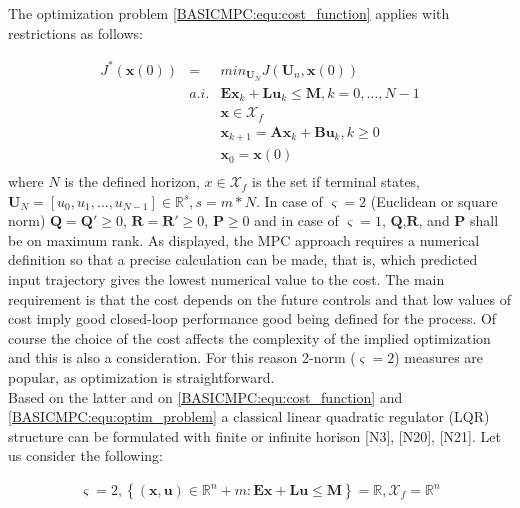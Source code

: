 		The optimization problem \ref{BASICMPC:equ:cost_function} applies with restrictions as follows:
		
		\begin{equation}
        \begin{array}{rcl}
				J^*(\textbf{x}(0))&=&min_{\textbf{U}_N}J(\textbf{U}_n,\textbf{x}(0))\\
					&a.i.&\textbf{Ex}_k+\textbf{Lu}_k\leq \textbf{M},k=0,\dots,N-1\\
					&&\textbf{x}\in \mathcal{X}_f\\
					&&\textbf{x}_{k+1}=\textbf{Ax}_k+\textbf{Bu}_k,k\geq0\\
					&&\textbf{x}_0=\textbf{x}(0)\\
        \end{array}
        \label{BASICMPC:equ:optim_problem}
    \end{equation}
		where $N$ is the defined horizon, $x\in \mathcal{X}_f$ is the set if terminal states, $\textbf{U}_N=[u_0,u_1,\dots,u_{N-1}]\in\mathbb{R}^s,s=m*N$. In case of $\varsigma=2$ (Euclidean or square norm) $\textbf{Q}=\textbf{Q}'\geq0$, $\textbf{R}=\textbf{R}'\geq0$, $\textbf{P}\geq0$ and in case of $\varsigma=1$, $\textbf{Q}$,$\textbf{R}$, and $\textbf{P}$ shall be on maximum rank. As displayed, the MPC approach requires a numerical definition so that a precise calculation can be made, that is, which predicted input trajectory gives the lowest numerical value to the cost. The main requirement is that the cost depends on the future controls and that low values of cost imply good closed-loop performance good being defined for the process. Of course the choice of the cost affects the complexity of the implied optimization and this is also a consideration. For this reason 2-norm ($\varsigma=2$) measures are popular, as optimization is straightforward.\\
		Based on the latter and on \ref{BASICMPC:equ:cost_function} and \ref{BASICMPC:equ:optim_problem} a classical linear quadratic regulator (LQR) structure can be formulated with finite or infinite horison [N3], [N20], [N21].
		Let us consider the following:
		
		\begin{equation}
        \begin{array}{c}
         \varsigma=2, \left\{(\textbf{x},\textbf{u})\in\mathbb{R}^n+m:\textbf{Ex}+\textbf{Lu}\leq \textbf{M}\right\}=\mathbb{R},\mathcal{X}_f=\mathbb{R}^n\\
        \end{array}
        \label{BASICMPC:equ:quadratic_case}
    \end{equation}
		
